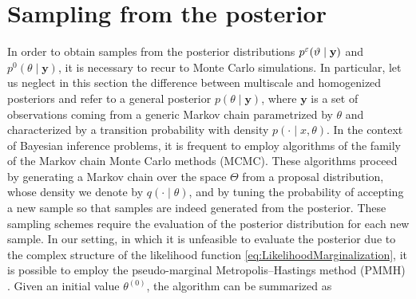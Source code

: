 \documentclass[10pt]{article}
\begin{document}
\section{Sampling from the posterior}

In order to obtain samples from the posterior distributions $p^\varepsilon(\vartheta \mid \mathbf y)$ and $p^0(\theta \mid \mathbf y)$, it is necessary to recur to Monte Carlo simulations. In particular, let us neglect in this section the difference between multiscale and homogenized posteriors and refer to a general posterior $p(\theta \mid \mathbf y)$, where $\mathbf y$ is a set of observations coming from a generic Markov chain parametrized by $\theta$ and characterized by a transition probability with density $p(\cdot \mid x, \theta)$. In the context of Bayesian inference problems, it is frequent to employ algorithms of the family of the Markov chain Monte Carlo methods (MCMC). These algorithms proceed by generating a Markov chain over the space $\Theta$ from a proposal distribution, whose density we denote by $q(\cdot \mid \theta)$, and by tuning the probability of accepting a new sample so that samples are indeed generated from the posterior. These sampling schemes require the evaluation of the posterior distribution for each new sample. In our setting, in which it is unfeasible to evaluate the posterior due to the complex structure of the likelihood function \eqref{eq:LikelihoodMarginalization}, it is possible to employ the pseudo-marginal Metropolis--Hastings method (PMMH) \cite{AnR09}. Given an initial value $\theta^{(0)}$, the algorithm can be summarized as
\end{document}
